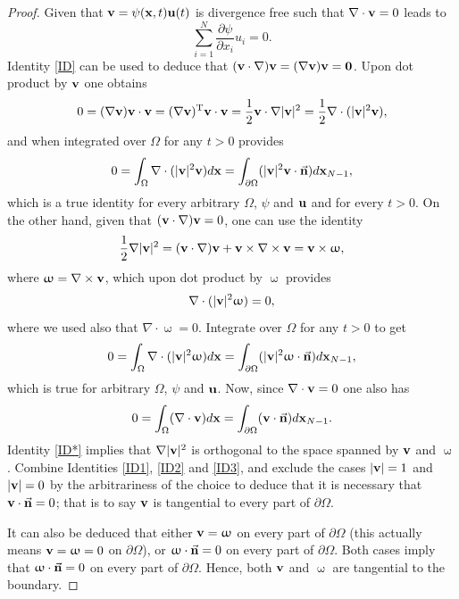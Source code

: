 \documentclass[a4 paper, 11pt,twoside]{article}
\newcommand{\Bf}[1]{{\bf{#1}}}
\newcommand{\V}{{\bf{v}}}
\newcommand{\X}{{\bf{x}}}
\newcommand{\U}{{\bf{u}}}
\newcommand{\0}{\Bf{0}}
\theoremstyle{definition}
\begin{document}
\begin{proof}
Given that $\V=\psi(\X,t)\U(t)$ is divergence free such that $\nabla\cdot\V=0$ leads to
\begin{equation}
\sum_{i=1}^N\frac{\partial\psi}{\partial x_i}u_i=0.
\label{ID}
\end{equation}
{\color{black}Identity \eqref{ID} can be used} to deduce that $(\V\cdot\nabla)\V=(\nabla\V)\V=\0$. {\color{black}Upon dot product by $\V$ one obtains}
\begin{equation}
0=(\nabla\V)\V\cdot\V=(\nabla\V)^{\rm{T}}\V\cdot\V=\frac{1}{2}\V\cdot\nabla|\V|^2=\frac{1}{2}\nabla\cdot(|\V|^2\V),
\label{ID0}
\end{equation}
{\color{black}and} when integrated over $\Omega$ for any $t>0$ provides
\begin{equation}
0=\int_{\Omega}\nabla\cdot(|\V|^2\V)d\X=\int_{\partial\Omega}(|\V|^2\V\cdot\vec{\Bf{n}})d\X_{N-1},
\label{ID1}
\end{equation}
which is a true identity for every arbitrary $\Omega$, $\psi$ and $\U$ and for every $t>0$. On the other hand, given that $(\V\cdot\nabla)\V=0$, {\color{black}one can use} the identity
\begin{equation}
\frac{1}{2}\nabla|\V|^2=(\V\cdot\nabla)\V+\V\times\nabla\times\V=\V\times\upomega,
\label{ID*}
\end{equation}
where $\upomega=\nabla\times\V$, which upon dot product by $\upomega$ provides
\[
\nabla\cdot(|\V|^2\upomega)=0,
\]
where we used also that $\nabla\cdot\upomega=0$. Integrate over $\Omega$ for any $t>0$ to get
\begin{equation}
0=\int_{\Omega}\nabla\cdot(|\V|^2\upomega)d\X=\int_{\partial\Omega}(|\V|^2\upomega\cdot\vec{\Bf{n}})d\X_{N-1},
\label{ID2}
\end{equation}
which is true for arbitrary $\Omega$, $\psi$ and $\U$. Now, since $\nabla\cdot\V=0$ {\color{black}one also has}
\begin{equation}
0=\int_{\Omega}(\nabla\cdot\V) d\X=\int_{\partial\Omega}(\V\cdot\vec{\Bf{n}})d\X_{N-1}.
\label{ID3}
\end{equation}
Identity \eqref{ID*} implies that $\nabla|\V|^2$ is orthogonal to the space spanned by $\V$ and $\upomega$. {\color{black}Combine} Identities \eqref{ID1}, \eqref{ID2} and \eqref{ID3}, and {\color{black}exclude} the cases $|\V|=1$ and $|\V|=0$ by the arbitrariness of the choice to deduce that it is necessary that $\V\cdot\vec{\Bf{n}}=0$; that is to say $\V$ is tangential to every part of $\partial\Omega$.

{\color{black}It can also be deduced} that either $\V=\upomega$ on every part of $\partial\Omega$ (this actually means $\V=\upomega=0$ on $\partial\Omega$), or $\upomega\cdot\vec{\Bf{n}}=0$ on every part of $\partial\Omega$. Both cases imply that $\upomega\cdot\vec{\Bf{n}}=0$ on every part of $\partial\Omega$. Hence, both $\V$ and $\upomega$ are tangential to the boundary.
\end{proof}
\end{document}

